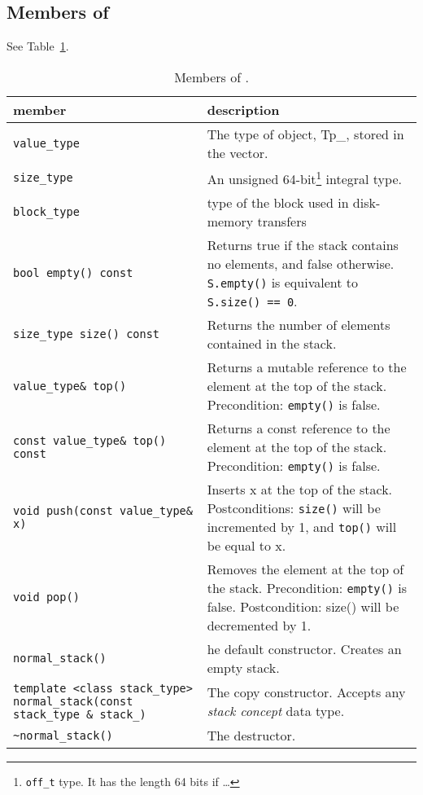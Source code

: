 \documentclass[twoside]{book}
\begin{document}
\subsection*{Members of \xnormalstack}
See Table~\ref{normalstackmembers}.

\begin{table}[h]
\begin{center}
\caption{Members of \xnormalstack.}
\label{normalstackmembers}
\begin{tabular}{|p{6cm}|p{5cm}|}
\hline
member & description  \\
\hline\hline
\texttt{value\_type} &  The type of object, Tp\_, stored in the vector. \\
\hline
\texttt{size\_type} & An unsigned 64-bit\footnote{\texttt{off\_t}
type. It has the length 64 bits if \ldots} integral type. \\  
\hline
\texttt{block\_type} & type of the block used in disk-memory 
transfers \\
\hline
\texttt{bool empty() const} &  Returns true if the stack contains no
elements, and false  otherwise. \texttt{S.empty()} is equivalent to \texttt{S.size() ==
0}. \\ 
\hline
\texttt{size\_type size() const} & Returns the number of elements
contained in the stack. \\
\hline
\texttt{value\_type\& top()} & Returns a mutable reference to the
element at the top of the stack. Precondition: \texttt{empty()} is
false. \\ 
\hline
\texttt{const value\_type\& top() const} & Returns a const reference
to the element at the top of the stack. Precondition: \texttt{empty()} is
false.\\ 
\hline
\texttt{void push(const value\_type\& x)} & Inserts x at the top of
the stack. Postconditions: \texttt{size()} will be incremented by 1,
and \texttt{top()} will be equal to x. \\
\hline
\texttt{void pop()} & Removes the element at the top of the stack.
Precondition: \texttt{empty()} is false. Postcondition: size() will be
decremented by 1. \\ 
\hline
\texttt{normal\_stack()} & he default constructor. Creates an empty
stack.\\
\hline
\texttt{template <class stack\_type>
normal\_stack(const stack\_type \& stack\_)} & The copy
constructor. Accepts any \emph{stack concept} data type.\\ 
\hline
\texttt{\textasciitilde normal\_stack()} & The destructor.\\
\hline
\end{tabular}
\end{center}
\end{table}
\end{document}
